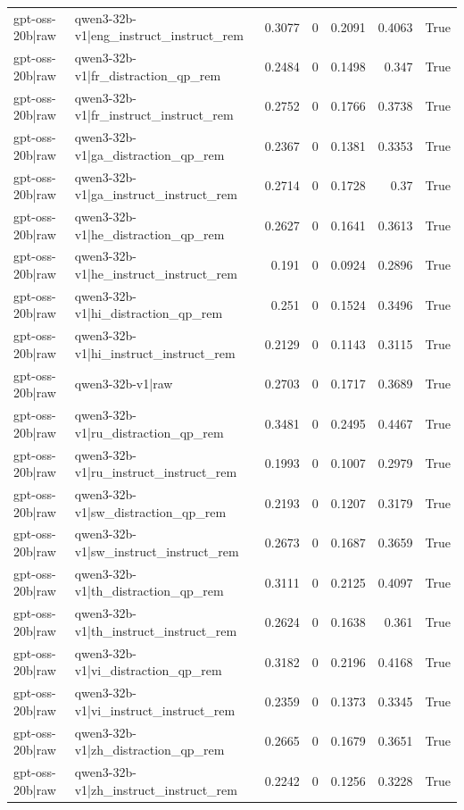 \begin{table}
\begin{tabular}{l l r r r r l}
gpt-oss-20b|raw & qwen3-32b-v1|eng_instruct_instruct_rem & 0.3077 & 0 & 0.2091 & 0.4063 & True \\
gpt-oss-20b|raw & qwen3-32b-v1|fr_distraction_qp_rem & 0.2484 & 0 & 0.1498 & 0.347 & True \\
gpt-oss-20b|raw & qwen3-32b-v1|fr_instruct_instruct_rem & 0.2752 & 0 & 0.1766 & 0.3738 & True \\
gpt-oss-20b|raw & qwen3-32b-v1|ga_distraction_qp_rem & 0.2367 & 0 & 0.1381 & 0.3353 & True \\
gpt-oss-20b|raw & qwen3-32b-v1|ga_instruct_instruct_rem & 0.2714 & 0 & 0.1728 & 0.37 & True \\
gpt-oss-20b|raw & qwen3-32b-v1|he_distraction_qp_rem & 0.2627 & 0 & 0.1641 & 0.3613 & True \\
gpt-oss-20b|raw & qwen3-32b-v1|he_instruct_instruct_rem & 0.191 & 0 & 0.0924 & 0.2896 & True \\
gpt-oss-20b|raw & qwen3-32b-v1|hi_distraction_qp_rem & 0.251 & 0 & 0.1524 & 0.3496 & True \\
gpt-oss-20b|raw & qwen3-32b-v1|hi_instruct_instruct_rem & 0.2129 & 0 & 0.1143 & 0.3115 & True \\
gpt-oss-20b|raw & qwen3-32b-v1|raw & 0.2703 & 0 & 0.1717 & 0.3689 & True \\
gpt-oss-20b|raw & qwen3-32b-v1|ru_distraction_qp_rem & 0.3481 & 0 & 0.2495 & 0.4467 & True \\
gpt-oss-20b|raw & qwen3-32b-v1|ru_instruct_instruct_rem & 0.1993 & 0 & 0.1007 & 0.2979 & True \\
gpt-oss-20b|raw & qwen3-32b-v1|sw_distraction_qp_rem & 0.2193 & 0 & 0.1207 & 0.3179 & True \\
gpt-oss-20b|raw & qwen3-32b-v1|sw_instruct_instruct_rem & 0.2673 & 0 & 0.1687 & 0.3659 & True \\
gpt-oss-20b|raw & qwen3-32b-v1|th_distraction_qp_rem & 0.3111 & 0 & 0.2125 & 0.4097 & True \\
gpt-oss-20b|raw & qwen3-32b-v1|th_instruct_instruct_rem & 0.2624 & 0 & 0.1638 & 0.361 & True \\
gpt-oss-20b|raw & qwen3-32b-v1|vi_distraction_qp_rem & 0.3182 & 0 & 0.2196 & 0.4168 & True \\
gpt-oss-20b|raw & qwen3-32b-v1|vi_instruct_instruct_rem & 0.2359 & 0 & 0.1373 & 0.3345 & True \\
gpt-oss-20b|raw & qwen3-32b-v1|zh_distraction_qp_rem & 0.2665 & 0 & 0.1679 & 0.3651 & True \\
gpt-oss-20b|raw & qwen3-32b-v1|zh_instruct_instruct_rem & 0.2242 & 0 & 0.1256 & 0.3228 & True \\

\end{tabular}
\end{table}
